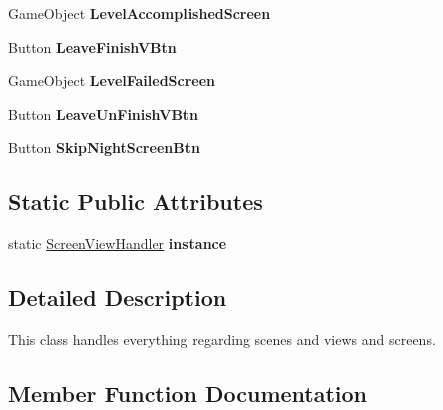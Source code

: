 \begin{DoxyCompactItemize}
Game\+Object {\bfseries Level\+Accomplished\+Screen}
\item 
\mbox{\label{class_dr_evil_1_1_mechanics_1_1_screen_view_handler_aec3e4add2f532723a55e1f28fb0ecd32}} 
Button {\bfseries Leave\+Finish\+V\+Btn}
\item 
\mbox{\label{class_dr_evil_1_1_mechanics_1_1_screen_view_handler_a372e2777dad0e70941b8a7ee9128a926}} 
Game\+Object {\bfseries Level\+Failed\+Screen}
\item 
\mbox{\label{class_dr_evil_1_1_mechanics_1_1_screen_view_handler_a19942a6dc923ab1c8b0606311f485df0}} 
Button {\bfseries Leave\+Un\+Finish\+V\+Btn}
\item 
\mbox{\label{class_dr_evil_1_1_mechanics_1_1_screen_view_handler_ad86091f5532480fa462b80ce686e8df8}} 
Button {\bfseries Skip\+Night\+Screen\+Btn}
\end{DoxyCompactItemize}
\subsection*{Static Public Attributes}
\begin{DoxyCompactItemize}
\item 
\mbox{\label{class_dr_evil_1_1_mechanics_1_1_screen_view_handler_a257f83fe478544c684483bd3d87ee823}} 
static \mbox{\hyperlink{class_dr_evil_1_1_mechanics_1_1_screen_view_handler}{Screen\+View\+Handler}} {\bfseries instance}
\end{DoxyCompactItemize}


\subsection{Detailed Description}
This class handles everything regarding scenes and views and screens. 



\subsection{Member Function Documentation}
\mbox{\label{class_dr_evil_1_1_mechanics_1_1_screen_view_handler_a51ae8bed2d6b3baf19756258c6b27b16}} 
